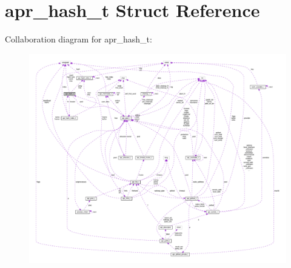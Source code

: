 \hypertarget{structapr__hash__t}{}\section{apr\+\_\+hash\+\_\+t Struct Reference}
\label{structapr__hash__t}


Collaboration diagram for apr\+\_\+hash\+\_\+t\+:
\nopagebreak
\begin{figure}[H]
\begin{center}
\leavevmode
\includegraphics[width=350pt]{structapr__hash__t__coll__graph}
\end{center}
\end{figure}
